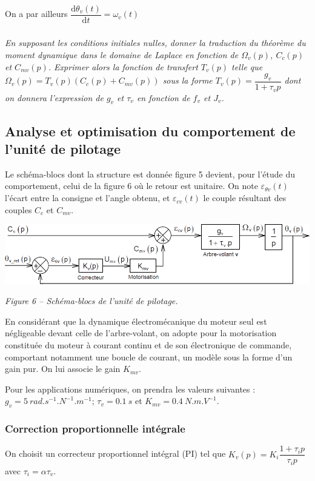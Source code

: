 \documentclass[10pt,fleqn]{article} %
\begin{document}
On a par ailleurs $\dfrac{\text{d}\theta_v(t)}{\text{d} t}=\omega_v(t)$

\subparagraph{}
\textit{En supposant les conditions initiales nulles, donner la traduction du théorème du moment dynamique dans le
domaine de Laplace en fonction de $\Omega_v(p)$, $C_c(p)$ et $C_{mv}(p)$.  Exprimer alors la fonction de transfert $T_v(p)$ telle que 
$\Omega_v(p)=T_v(p)\left( C_c(p)+C_{mv}(p)\right)$ sous la forme $T_v(p)=\dfrac{g_v}{1+\tau_vp}$ dont on donnera l'expression de $g_v$ et $\tau_v$ en fonction de $f_v$ et $J_v$.}
\ifprof
\begin{corrige}
\end{corrige}
\else
\fi

\subsection{Analyse et optimisation du comportement de l'unité de pilotage}
Le schéma-blocs dont la structure est donnée figure 5 devient, pour l'étude du comportement, celui de
la figure 6 où le retour est unitaire. On note $\varepsilon_{\theta v}(t)$ l'écart entre la consigne et l'angle obtenu, et $\varepsilon_{c v}(t)$ le couple résultant des couples $C_c$ et $C_{mv}$.


\begin{center}
\includegraphics[width=\linewidth]{images/fig_16}

\textit{Figure 6 -- Schéma-blocs de l'unité de pilotage.}
\end{center}

En considérant que la dynamique électromécanique du moteur seul est négligeable devant celle de
l'arbre-volant, on adopte pour la motorisation constituée du moteur à courant continu et de son
électronique de commande, comportant notamment une boucle de courant, un modèle sous la forme
d'un gain pur. On lui associe le gain $K_{mv}$.

Pour les applications numériques, on prendra les valeurs suivantes : 
$g_v = \SI{5}{rad.s^{-1}.N^{-1}.m^{-1}}$; $\tau_v=\SI{0,1}{s}$ et $K_{mv} = \SI{0,4}{N.m.V^{-1}}$.


\subsubsection*{Correction proportionnelle intégrale}
On choisit un correcteur proportionnel intégral (PI) tel que $K_v(p)=K_i\dfrac{1+\tau_i p}{\tau_i p}$ avec $\tau_i=\alpha \tau_v$.
\end{document}
